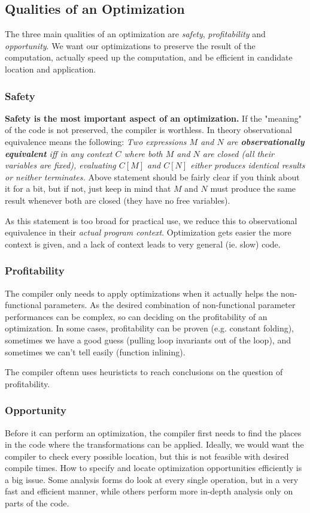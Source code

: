 \documentclass{article}
\begin{document}
\subsection{Qualities of an Optimization}
The three main qualities of an optimization are \emph{safety}, \emph{profitability} and \emph{opportunity}.
We want our optimizations to preserve the result of the computation, actually speed up the computation, and be efficient in candidate location and application.

\subsubsection{Safety}
\textbf{Safety is the most important aspect of an optimization.}
If the "meaning" of the code is not preserved, the compiler is worthless.
In theory observational equivalence means the following:
\emph{Two expressions $M$ and $N$ are \textbf{observationally equivalent} iff in any context $C$ where both $M$ and $N$ are closed (all their variables are fixed), evaluating $C\left[M\right]$ and $C\left[N\right]$ either produces identical results or neither terminates.}
Above statement should be fairly clear if you think about it for a bit, but if not, just keep in mind that $M$ and $N$ must produce the same result whenever both are closed (they have no free variables).

As this statement is too broad for practical use, we reduce this to observational equivalence in their \emph{actual program context}.
Optimization gets easier the more context is given, and a lack of context leads to very general (ie. slow) code.

\subsubsection{Profitability}
The compiler only needs to apply optimizations when it actually helps the non-functional parameters.
As the desired combination of non-functional parameter performances can be complex, so can deciding on the profitability of an optimization.
In some cases, profitability can be proven (e.g. constant folding), sometimes we have a good guess (pulling loop invariants out of the loop), and sometimes we can't tell easily (function inlining).

The compiler oftenn uses heuristicts to reach conclusions on the question of profitability.

\subsubsection{Opportunity}
Before it can perform an optimization, the compiler first needs to find the places in the code where the transformations can be applied.
Ideally, we would want the compiler to check every possible location, but this is not feasible with desired compile times.
How to specify and locate optimization opportunities efficiently is a big issue.
Some analysis forms do look at every single operation, but in a very fast and efficient manner, while others perform more in-depth analysis only on parts of the code.
\end{document}
